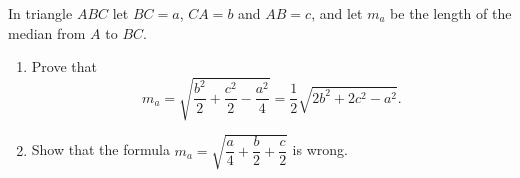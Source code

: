 In triangle $ABC$ let $BC=a$, $CA=b$ and $AB=c$, and let $m_a$ be the length of the median from $A$ to $BC$.
\begin{enumerate}
\item[(a)] Prove that
\[m_a=\sqrt{\dfrac{b^2}{2}+\dfrac{c^2}{2}-\dfrac{a^2}{4}}=\dfrac12\sqrt{2b^2+2c^2-a^2}.\]
\item[(b)] Show that the formula $m_a=\sqrt{\dfrac a4+\dfrac b2+\dfrac c2}$ is wrong.
\end{enumerate}

